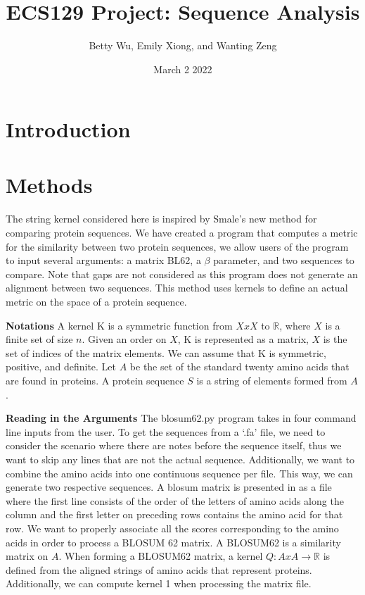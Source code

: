 \documentclass{article}
\title{ECS129 Project: Sequence Analysis}
\author{Betty Wu, Emily Xiong, and Wanting Zeng  }
\date{March 2 2022}
\begin{document}
\maketitle

\section{Introduction}

\section{Methods}

\paragraph{}
The string kernel considered here is inspired by Smale’s new method for comparing protein sequences. We have created a program that computes a metric for the similarity between two protein sequences, we allow users of the program to input several arguments: a matrix BL62, a $\beta$ parameter, and two sequences to compare. Note that gaps are not considered as this program does not generate an alignment between two sequences. This method uses kernels to define an actual metric on the space of a protein sequence. 

\textbf{Notations}
A kernel K is a symmetric function from $X x X$ to $\mathbb{R}$, where $X$ is a finite set of size $n$. Given an order on $X$, K is represented as a matrix, $X$ is the set of indices of the matrix elements. We can assume that K is symmetric, positive, and definite. Let $A$ be the set of the standard twenty amino acids that are found in proteins. A protein sequence $S$ is a string of elements formed from $A$.

\textbf{Reading in the Arguments}
The blosum62.py program takes in four command line inputs from the user. To get the sequences from a ‘.fa’ file, we need to consider the scenario where there are notes before the sequence itself, thus we want to skip any lines that are not the actual sequence. Additionally, we want to combine the amino acids into one continuous sequence per file. This way, we can generate two respective sequences. 
A blosum matrix is presented in as a file where the first line consists of the order of the letters of amino acids along the column and the first letter on preceding rows contains the amino acid for that row. We want to properly associate all the scores corresponding to the amino acids in order to process a BLOSUM 62 matrix. A BLOSUM62 is a similarity matrix on $A$. When forming a BLOSUM62 matrix, a kernel $Q \colon A x A \to \mathbb{R}$ is defined from the aligned strings of amino acids that represent proteins. Additionally, we can compute kernel 1 when processing the matrix file. 
\end{document}
